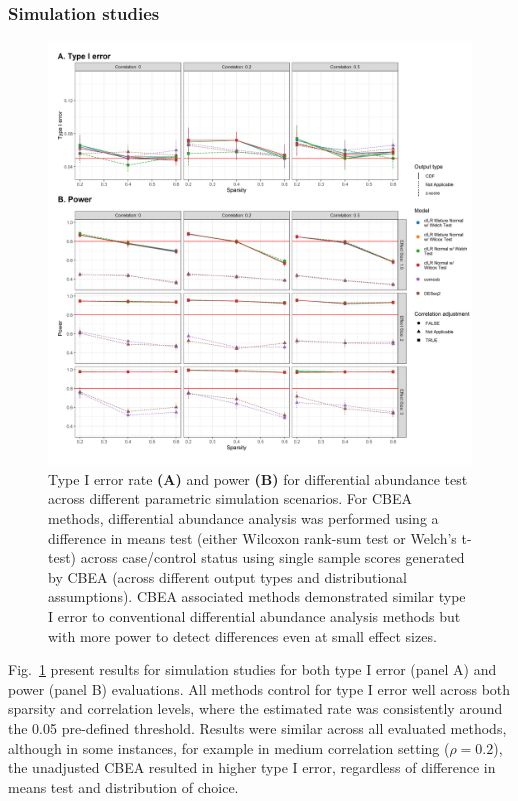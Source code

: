 \documentclass[10pt,letterpaper]{article}
\begin{document}
\subsubsection*{Simulation studies}
\begin{figure}[!h]
    \centering
    \includegraphics[width = \textwidth]{figures/sim_diff_ab_comb.png}
    \caption{Type I error rate \textbf{(A)} and power \textbf{(B)} for differential abundance test across different parametric simulation scenarios. For CBEA methods, differential abundance analysis was performed using a difference in means test (either Wilcoxon rank-sum test or Welch's t-test) across case/control status using single sample scores generated by CBEA (across different output types and distributional assumptions). CBEA associated methods demonstrated similar type I error to conventional differential abundance analysis methods but with more power to detect differences even at small effect sizes.} 
    \label{fig:4}
\end{figure}

Fig.~\ref{fig:4} present results for simulation studies for both type I error (panel A) and power (panel B) evaluations. All methods control for type I error well across both sparsity and correlation levels, where the estimated rate was consistently around the 0.05 pre-defined threshold. Results were similar across all evaluated methods, although in some instances, for example in medium correlation setting ($\rho = 0.2$), the unadjusted CBEA resulted in higher type I error, regardless of difference in means test and distribution of choice. 
\end{document}
